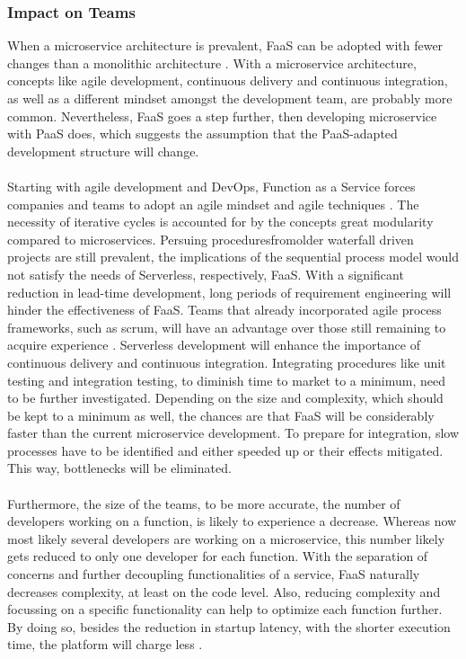 \documentclass[a4paper,twoside,11pt, pagesize]{scrartcl}
\begin{document}
\begin{spacing}{1.2}
\subsubsection{Impact on Teams}When a microservice architecture is prevalent, FaaS can be adopted with fewer changes than a monolithic architecture \cite{fox2017status}. With a microservice architecture, concepts like agile development, continuous delivery and continuous integration, as well as a different mindset amongst the development team, are probably more common. Nevertheless, FaaS goes a step further, then developing microservice with PaaS does, which suggests the assumption that the PaaS-adapted development structure will change.\\\\ Starting with agile development and \glqq DevOps\grqq{}, Function as a Service forces companies and teams to adopt an agile mindset and agile techniques \cite{benlian2018transformative}. The necessity of iterative cycles is accounted for by the concepts great modularity compared to microservices. Persuing proceduresfromolder waterfall driven projects are still prevalent, the implications of the sequential process model would not satisfy the needs of Serverless, respectively, FaaS. With a significant reduction in lead-time development, long periods of requirement engineering will hinder the effectiveness of FaaS. Teams that already incorporated agile process frameworks, such as scrum, will have an advantage over those still remaining to acquire experience \cite{battleson2016achieving}. Serverless development will enhance the importance of continuous delivery and continuous integration. Integrating procedures like unit testing and integration testing, to diminish time to market to a minimum, need to be further investigated. Depending on the size and complexity, which should be kept to a minimum as well, the chances are that FaaS will be considerably faster than the current microservice development. To prepare for integration, slow processes have to be identified and either speeded up or their effects mitigated. This way, bottlenecks will be eliminated.\\\\ Furthermore, the size of the teams, to be more accurate, the number of developers working on a function, is likely to experience a decrease. Whereas now most likely several developers are working on a microservice, this number likely gets reduced to only one developer for each function. With the separation of concerns and further decoupling functionalities of a service, FaaS naturally decreases complexity, at least on the code level. Also, reducing complexity and focussing on a specific functionality can help to optimize each function further. By doing so, besides the reduction in startup latency, with the shorter execution time, the platform will charge less \cite{shafiei2020serverless}.\\\\ 

\end{spacing}
\end{document}

